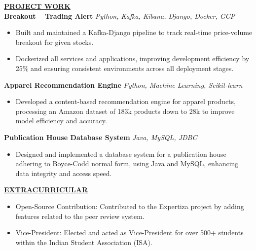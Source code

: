 \documentclass{article}
\begin{document}
\noindent \textbf{\underline{PROJECT WORK}} \\
\noindent \textbf{Breakout – Trading Alert} \textit{Python, Kafka, Kibana, Django, Docker, GCP} \hfill \textbf{}
\begin{itemize}[noitemsep,nolistsep,leftmargin=*]
\item {\small Built and maintained a Kafka-Django pipeline to track real-time price-volume breakout for given stocks.}
\item {\small Dockerized all services and applications, improving development efficiency by 25\% and ensuring consistent environments across all deployment stages.}
\end{itemize}

\noindent \textbf{Apparel Recommendation Engine} \textit{Python, Machine Learning, Scikit-learn} \hfill \textbf{}
\begin{itemize}[noitemsep,nolistsep,leftmargin=*]
\item {\small Developed a content-based recommendation engine for apparel products, processing an Amazon dataset of 183k products down to 28k to improve model efficiency and accuracy.}
\end{itemize}

\noindent \textbf{Publication House Database System} \textit{Java, MySQL, JDBC} \hfill \textbf{}
\begin{itemize}[noitemsep,nolistsep,leftmargin=*]
\item {\small Designed and implemented a database system for a publication house adhering to Boyce-Codd normal form, using Java and MySQL, enhancing data integrity and access speed.}\\
\end{itemize}

\noindent \textbf{\underline{EXTRACURRICULAR}} 
\begin{itemize}[noitemsep,nolistsep,leftmargin=*]
\item {\small Open-Source Contribution: Contributed to the Expertiza project by adding features related to the peer review system.}
\item {\small Vice-President: Elected and acted as Vice-President for over 500+ students within the Indian Student Association (ISA).}
\end{itemize}




\end{document}
